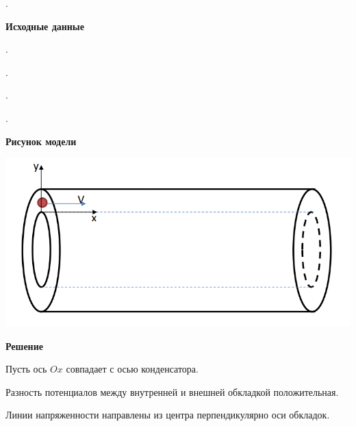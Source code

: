 \documentclass[12pt]{article}
\begin{document}
    . 
    \smallvspace
    
    \begin{flushleft}
        {\large \textbf{Исходные данные}}
    \end{flushleft}

    . 
    \smallvspace
    
    . 
    \smallvspace
    
    . 
    \smallvspace
    
    . 
    \smallvspace

    \clearpage

    \begin{flushleft}
        {\large \textbf{Рисунок модели}}
    \end{flushleft}

    \begin{center}
        \includegraphics[width=15cm]{images/cond.png}
    \end{center}

    \mediumvspace


    \begin{flushleft}
        {\Large \textbf{Решение}}    
    \end{flushleft}

    Пусть ось $Ox$ совпадает с осью конденсатора.
    
    Разность потенциалов между внутренней и внешней обкладкой положительная. 
    
    Линии напряженности направлены из центра перпендикулярно оси обкладок.
\end{document}
